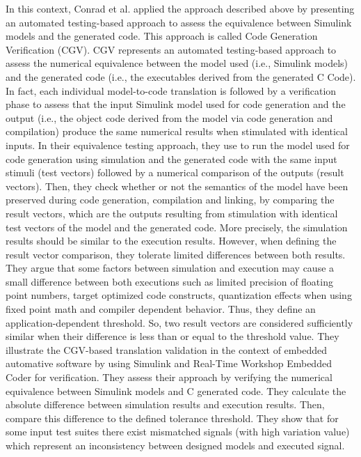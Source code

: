 In this context, Conrad et al.\cite{conrad2010code} applied the approach described above by presenting an automated testing-based approach to assess the equivalence between Simulink models and the generated code. This approach is called Code Generation Verification (CGV).
CGV represents an automated testing-based approach to assess the numerical equivalence between the model used (i.e., Simulink models) and the generated code (i.e., the executables derived from the generated C Code). 
In fact, each individual model-to-code translation is followed by a verification phase to assess that the input Simulink model used for code generation and the output (i.e., the object code derived from the model via code generation and compilation) produce the same numerical results when stimulated with identical inputs. 
In their equivalence testing approach, they use to run the model used for code generation using simulation and the generated code with the same input stimuli (test vectors) followed by a numerical comparison of the outputs (result vectors).
Then, they check whether or not the semantics of the model have been preserved during code generation, compilation and linking, by comparing the result vectors, which are the outputs resulting from stimulation with identical test vectors of the model and the generated code.
More precisely, the simulation results should be similar to the execution results. However, when defining the result vector comparison, they tolerate limited differences between both results. They argue that some factors between simulation and execution may cause a small difference between both executions such as limited precision of floating point numbers, target optimized code constructs, quantization effects when using fixed point math and compiler dependent behavior. 
Thus, they define an application-dependent threshold. So, two result vectors are considered sufficiently similar when their difference is less than or equal to the threshold value.
They illustrate the CGV-based translation validation in the context of embedded automative software by using Simulink and Real-Time Workshop Embedded Coder for verification. They assess their approach by verifying the numerical equivalence between Simulink models and C generated code. They calculate the absolute difference between simulation results and execution results. Then, compare this difference to the defined tolerance threshold. They show that for some input test suites there exist mismatched signals (with high variation value) which represent an inconsistency between designed models and executed signal.


